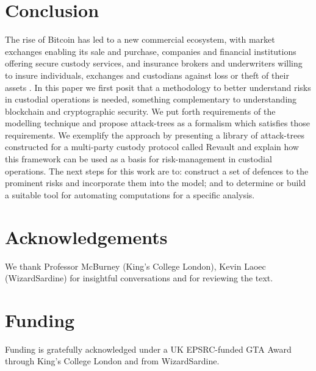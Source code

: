 \documentclass[runningheads]{llncs}
\begin{document}
\section{Conclusion}
\label{sec:Conclusion}

The rise of Bitcoin has led to a new commercial ecosystem, with market exchanges enabling its sale and purchase, companies and financial institutions offering secure custody services, and insurance brokers and underwriters willing to insure individuals, exchanges and custodians against loss or theft of their assets
. In this paper we first posit that a methodology to better understand risks in custodial operations is needed, something complementary to understanding blockchain and cryptographic security. We put forth requirements of the modelling technique and propose attack-trees as a formalism which satisfies those requirements. We exemplify the approach by presenting a library of attack-trees constructed for a multi-party custody protocol called Revault and explain how this framework can be used as a basis for risk-management in custodial operations. The next steps for this work are to: construct a set of defences to the prominent risks and incorporate them into the model; and to determine or build a suitable tool for automating computations for a specific analysis. 

\section*{Acknowledgements}

We thank Professor McBurney (King's College London), Kevin Laoec (WizardSardine) for insightful conversations and for reviewing the text. 

\section*{Funding}

Funding is gratefully acknowledged under a UK EPSRC-funded GTA Award through King's College London and from WizardSardine.



\end{document}
